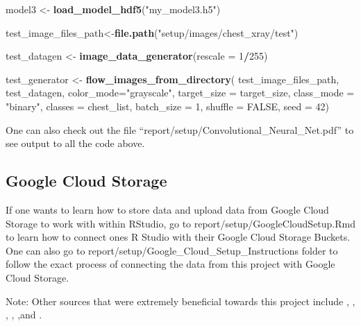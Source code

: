 \documentclass[12pt]{article}
\newenvironment{Shaded}{\begin{snugshade}}{\end{snugshade}}
\newcommand{\DataTypeTok}[1]{\textcolor[rgb]{0.13,0.29,0.53}{#1}}
\newcommand{\DecValTok}[1]{\textcolor[rgb]{0.00,0.00,0.81}{#1}}
\newcommand{\KeywordTok}[1]{\textcolor[rgb]{0.13,0.29,0.53}{\textbf{#1}}}
\newcommand{\NormalTok}[1]{#1}
\newcommand{\OperatorTok}[1]{\textcolor[rgb]{0.81,0.36,0.00}{\textbf{#1}}}
\newcommand{\OtherTok}[1]{\textcolor[rgb]{0.56,0.35,0.01}{#1}}
\newcommand{\StringTok}[1]{\textcolor[rgb]{0.31,0.60,0.02}{#1}}
\begin{document}
\begin{Shaded}
\begin{Highlighting}[]
\NormalTok{model3 <-}\StringTok{ }\KeywordTok{load_model_hdf5}\NormalTok{(}\StringTok{"my_model3.h5"}\NormalTok{)}

\NormalTok{test_image_files_path<-}\KeywordTok{file.path}\NormalTok{(}\StringTok{"setup/images/chest_xray/test"}\NormalTok{)}

\NormalTok{test_datagen <-}\StringTok{ }\KeywordTok{image_data_generator}\NormalTok{(}\DataTypeTok{rescale =} \DecValTok{1}\OperatorTok{/}\DecValTok{255}\NormalTok{)}

\NormalTok{test_generator <-}\StringTok{ }\KeywordTok{flow_images_from_directory}\NormalTok{(}
\NormalTok{        test_image_files_path,}
\NormalTok{        test_datagen,}
        \DataTypeTok{color_mode=}\StringTok{"grayscale"}\NormalTok{,}
        \DataTypeTok{target_size =}\NormalTok{ target_size,}
        \DataTypeTok{class_mode =} \StringTok{"binary"}\NormalTok{,}
        \DataTypeTok{classes =}\NormalTok{ chest_list,}
        \DataTypeTok{batch_size =} \DecValTok{1}\NormalTok{,}
        \DataTypeTok{shuffle =} \OtherTok{FALSE}\NormalTok{,}
        \DataTypeTok{seed =} \DecValTok{42}\NormalTok{)}
\end{Highlighting}
\end{Shaded}

\begin{Shaded}
\end{Shaded}

One can also check out the file
``report/setup/Convolutional\_Neural\_Net.pdf'' to see output to all the
code above.

\hypertarget{google-cloud-storage}{%
\subsection{Google Cloud Storage}\label{google-cloud-storage}}

If one wants to learn how to store data and upload data from Google
Cloud Storage to work with within RStudio, go to
report/setup/GoogleCloudSetup.Rmd to learn how to connect ones R Studio
with their Google Cloud Storage Buckets. One can also go to
report/setup/Google\_Cloud\_Setup\_Instructions folder to follow the
exact process of connecting the data from this project with Google Cloud
Storage.

Note: Other sources that were extremely beneficial towards this project
include \citep{PAD}, \citep{Medium}, \citep{CloudStorage},
\citep{Kaggle}, \citep{RPubs},and \citep{Shirin}. \newpage



\end{document}
